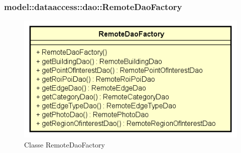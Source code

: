 \documentclass[../DefinizioneDiProdotto.tex]{subfiles}
\begin{document}
\subsubsection{model::dataaccess::dao::RemoteDaoFactory}

    \begin{figure}[H]
        \centering
        \includegraphics{img/RemoteDaoFactory.png}
        \caption{Classe RemoteDaoFactory}\label{fig:model::dataaccess::dao::RemoteDaoFactory} 
    \end{figure}
\end{document}
